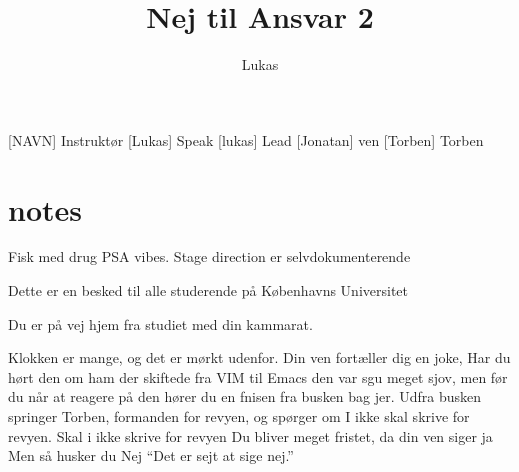 \documentclass[a4paper,11pt]{article}
\title{Nej til Ansvar 2}
\author{Lukas}
\begin{document}
\maketitle

\begin{roles}
[NAVN] Instruktør
 [Lukas] Speak
 [lukas] Lead
 [Jonatan] ven
 [Torben] Torben
\end{roles}

\begin{props}

\end{props}

\section*{notes}Fisk med drug PSA vibes. Stage direction er selvdokumenterende



\begin{sketch}
 Dette er en besked til alle studerende på Københavns Universitet

 Du er på vej hjem fra studiet med din kammarat.

 Klokken er mange, og det er mørkt udenfor.
 Din ven fortæller dig en joke,
 Har du hørt den om ham der skiftede fra VIM til Emacs
  den var sgu meget sjov, men før du når at reagere på den hører du en fnisen fra busken bag jer.
 Udfra busken springer Torben, formanden for revyen, og spørger om I ikke skal skrive for revyen.
 Skal i ikke skrive for revyen
 Du bliver meget fristet, da din ven siger ja
 Men så husker du
 Nej
 “Det er sejt at sige nej.”

\end{sketch}
\end{document}
